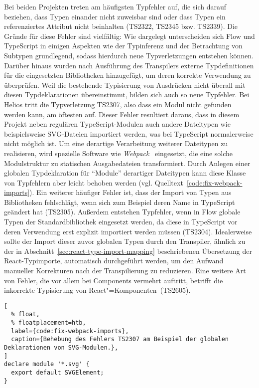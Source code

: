 Bei beiden Projekten treten am häufigsten Typfehler auf, die sich darauf beziehen, dass Typen einander nicht zuweisbar sind oder dass Typen ein referenziertes Attribut nicht beinhalten (TS2322, TS2345 bzw. TS2339). Die Gründe für diese Fehler sind vielfältig: Wie dargelegt unterscheiden sich Flow und TypeScript in einigen Aspekten wie der Typinferenz und der Betrachtung von Subtypen grundlegend, sodass hierdurch neue Typverletzungen entstehen können. Darüber hinaus wurden nach Ausführung des Transpilers externe Typdefinitionen für die eingesetzten Bibliotheken hinzugefügt, um deren korrekte Verwendung zu überprüfen. Weil die bestehende Typisierung von Ausdrücken nicht überall mit diesen Typdeklarationen übereinstimmt, bilden sich auch so neue Typfehler. Bei Helios tritt die Typverletzung TS2307, also dass ein Modul nicht gefunden werden kann, am öftesten auf. Dieser Fehler resultiert daraus, dass in diesem Projekt neben regulären TypeScript-Modulen auch andere Dateitypen wie beispielsweise SVG-Dateien importiert werden, was bei TypeScript normalerweise nicht möglich ist. Um eine derartige Verarbeitung weiterer Dateitypen zu realisieren, wird spezielle Software wie \textit{Webpack}~\autocite{WEBPACK} eingesetzt, die eine solche Modulstruktur zu statischen Ausgabedateien transformiert. Durch Anlegen einer globalen Typdeklaration für \enquote{Module} derartiger Dateitypen kann diese Klasse von Typfehlern aber leicht behoben werden (vgl. Quelltext~\ref{code:fix-webpack-imports}). Ein weiterer häufiger Fehler ist, dass der Import von Typen aus Bibliotheken fehlschlägt, wenn sich zum Beispiel deren Name in TypeScript geändert hat (TS2305). Außerdem entstehen Typfehler, wenn in Flow globale Typen der Standardbibliothek eingesetzt werden, da diese in TypeScript vor deren Verwendung erst explizit importiert werden müssen (TS2304). Idealerweise sollte der Import dieser zuvor globalen Typen durch den Transpiler, ähnlich zu der in Abschnitt~\ref{sec:react-type-import-mapping} beschriebenen Übersetzung der React-Typimporte, automatisch durchgeführt werden, um den Aufwand manueller Korrekturen nach der Transpilierung zu reduzieren. Eine weitere Art von Fehler, die vor allem bei Components vermehrt auftritt, betrifft die inkorrekte Typisierung von React"=Komponenten~(TS2605).

\begin{lstlisting}[
  % float,
  % floatplacement=htb,
  label={code:fix-webpack-imports},
  caption={Behebung des Fehlers TS2307 am Beispiel der globalen Deklarationen von SVG-Modulen.},
]
declare module '*.svg' {
  export default SVGElement;
}
\end{lstlisting}

